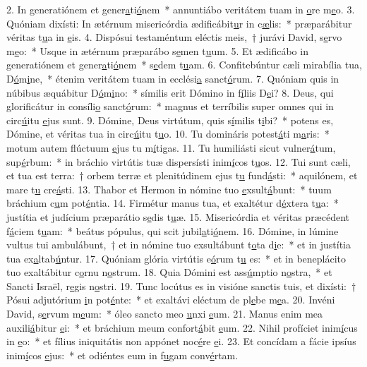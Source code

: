 2. In generatiónem et gener\uline{a}ti\uline{ó}nem~* annuntiábo veritátem tuam in \uline{o}re m\uline{e}o.
3. Quóniam dixísti: In ætérnum misericórdia ædificábit\uline{u}r in c\uline{æ}lis:~* præparábitur véritas t\uline{u}a in \uline{e}is.
4. Dispósui testaméntum eléctis meis,~† jurávi David, s\uline{e}rvo m\uline{e}o:~* Usque in ætérnum præparábo s\uline{e}men t\uline{u}um.
5. Et ædificábo in generatiónem et gener\uline{a}ti\uline{ó}nem~* s\uline{e}dem t\uline{u}am.
6. Confitebúntur cæli mirabília tua, D\uline{ó}m\uline{i}ne,~* étenim veritátem tuam in ecclési\uline{a} sanct\uline{ó}rum.
7. Quóniam quis in núbibus æquábitur D\uline{ó}m\uline{i}no:~* símilis erit Dómino in f\uline{í}liis D\uline{e}i?
8. Deus, qui glorificátur in consíli\uline{o} sanct\uline{ó}rum:~* magnus et terríbilis super omnes qui in circ\uline{ú}itu \uline{e}jus sunt.
9. Dómine, Deus virtútum, quis s\uline{í}milis t\uline{i}bi?~* potens es, Dómine, et véritas tua in circ\uline{ú}itu t\uline{u}o.
10. Tu domináris potest\uline{á}ti m\uline{a}ris:~* motum autem flúctuum \uline{e}jus tu m\uline{í}tigas.
11. Tu humiliásti sicut vulner\uline{á}tum, sup\uline{é}rbum:~* in bráchio virtútis tuæ dispersísti inim\uline{í}cos t\uline{u}os.
12. Tui sunt cæli, et tua est terra:~† orbem terræ et plenitúdinem ejus t\uline{u} fund\uline{á}sti:~* aquilónem, et mare t\uline{u} cre\uline{á}sti.
13. Thabor et Hermon in nómine tuo \uline{e}xsult\uline{á}bunt:~* tuum bráchium c\uline{u}m pot\uline{é}ntia.
14. Firmétur manus tua, et exaltétur d\uline{é}xtera t\uline{u}a:~* justítia et judícium præparátio s\uline{e}dis t\uline{u}æ.
15. Misericórdia et véritas præcédent f\uline{á}ciem t\uline{u}am:~* beátus pópulus, qui scit jubil\uline{a}ti\uline{ó}nem.
16. Dómine, in lúmine vultus tui ambulábunt,~† et in nómine tuo exsultábunt t\uline{o}ta d\uline{i}e:~* et in justítia tua ex\uline{a}ltab\uline{ú}ntur.
17. Quóniam glória virtútis e\uline{ó}rum t\uline{u} es:~* et in beneplácito tuo exaltábitur c\uline{o}rnu n\uline{o}strum.
18. Quia Dómini est ass\uline{ú}mptio n\uline{o}stra,~* et Sancti Israël, r\uline{e}gis n\uline{o}stri.
19. Tunc locútus es in visióne sanctis tuis, et dixísti:~† Pósui adjutórium \uline{i}n pot\uline{é}nte:~* et exaltávi eléctum de pl\uline{e}be m\uline{e}a.
20. Invéni David, s\uline{e}rvum m\uline{e}um:~* óleo sancto meo \uline{u}nxi \uline{e}um.
21. Manus enim mea auxili\uline{á}bitur \uline{e}i:~* et bráchium meum confort\uline{á}bit \uline{e}um.
22. Nihil profíciet inim\uline{í}cus in \uline{e}o:~* et fílius iniquitátis non appónet noc\uline{é}re \uline{e}i.
23. Et concídam a fácie ipsíus inim\uline{í}cos \uline{e}jus:~* et odiéntes eum in f\uline{u}gam conv\uline{é}rtam.
